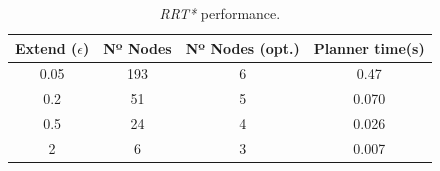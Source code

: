 \begin{table}[H]
\centering
\label{plan:accuracy_table}
    \begin{tabular}{|c|c|c|c|}
    \hline
    Extend ($\epsilon$)  & Nº Nodes & Nº Nodes (opt.) & Planner time(s)  \\ \hline
    0.05          &  193  & 6 &  0.47   \\ \hline
    0.2              &  51 & 5 & 0.070    \\ \hline
    0.5          & 24 & 4 & 0.026   \\ \hline
    2          &  6 & 3 & 0.007      \\ \hline

    \end{tabular}
    \caption[]{\textit{RRT*} performance.}
    \label{tab:plan}
\end{table}

